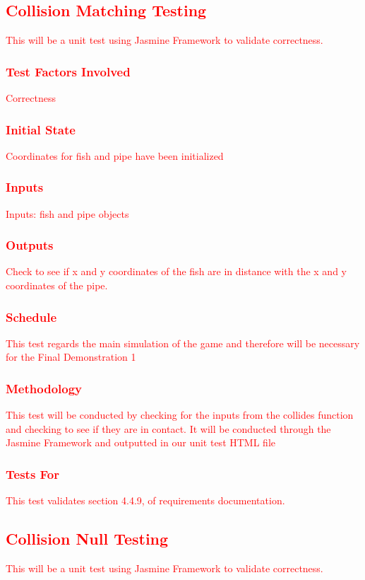 \documentclass[11pt, oneside]{article}   	%
\begin{document}
\subsection{\textcolor{red}{Collision Matching Testing}}
\textcolor{red}{This will be a unit test using Jasmine Framework to validate correctness.}
\subsubsection{\textcolor{red}{Test Factors Involved}}
\textcolor{red}{Correctness}
\subsubsection{\textcolor{red}{Initial State}}
\textcolor{red}{Coordinates for fish and pipe have been initialized}
\subsubsection{\textcolor{red}{Inputs}}
\textcolor{red}{Inputs: fish and pipe objects}
\subsubsection{\textcolor{red}{Outputs}}
\textcolor{red}{Check to see if x and y coordinates of the fish are in distance with the x and y coordinates of the pipe.}
\subsubsection{\textcolor{red}{Schedule}}
\textcolor{red}{This test regards the main simulation of the game and therefore will be necessary for the Final Demonstration 1}
\subsubsection{\textcolor{red}{Methodology}}
\textcolor{red}{This test will be conducted by checking for the inputs from the collides function and checking to see if they are in contact. It will be conducted through the Jasmine Framework and outputted in our unit test HTML file}
\subsubsection{\textcolor{red}{Tests For}}
\textcolor{red}{This test validates section 4.4.9, of requirements documentation.}



\subsection{\textcolor{red}{Collision Null Testing}}
\textcolor{red}{This will be a unit test using Jasmine Framework to validate correctness.}
\end{document}
